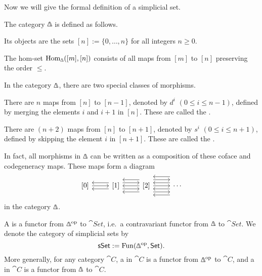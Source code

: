 Now we will give the formal definition of a simplicial set.

\begin{definition}
    The category $\bfDelta$ is defined as follows.
    \begin{itms}
        \item Its objects are the sets $[n]:=\{0,\dotsc,n\}$ for all integers $n\geq0$.
        \item The hom-set $\Hom_\bfDelta([m],[n])$ consists of all maps from $[m]$ to $[n]$
              preserving the order $\leq$.
    \end{itms}
\end{definition}

In the category $\bfDelta$, there are two special classes of morphisms.
\begin{itms}
    \item There are $n$ maps from $[n]$ to $[n-1]$,
    denoted by $d^i$ $(0\leq i\leq n-1)$,
    defined by merging the elements $i$ and $i+1$ in $[n]$.
    These are called the .
    \item There are $(n+2)$ maps from $[n]$ to $[n+1]$,
    denoted by $s^i$ $(0\leq i\leq n+1)$,
    defined by skipping the element $i$ in $[n+1]$.
    These are called the .
\end{itms}
In fact, all morphisms in $\bfDelta$
can be written as a composition of these coface and codegeneracy maps.
These maps form a diagram
\[\begin{tikzcd}
    \relax[0]\ar[r] &
    \relax[1]\ar[l,shift left=1ex]\ar[l,shift right=1ex]\ar[r,shift left=1ex]\ar[r,shift right=1ex] &
    \relax[2]\ar[l,shift left=2ex]\ar[l]\ar[l,shift right=2ex]\ar[r,shift left=2ex]\ar[r]\ar[r,shift right=2ex] &
    \cdots\ar[l,shift left=3ex]\ar[l,shift left=1ex]\ar[l,shift right=1ex]\ar[l,shift right=3ex]
\end{tikzcd}\]
in the category $\bfDelta$.

\begin{definition}
    A  is a functor from $\bfDelta\op$ to $\cat{Set}$,
    i.e.\ a contravariant functor from $\bfDelta$ to $\cat{Set}$.
    We denote the category of simplicial sets by
    \[\cat{sSet}:=\operatorname{Fun}(\bfDelta\op,\cat{Set}).\]
    More generally, for any category $\cat C$,
    a  in $\cat C$ is a functor from $\bfDelta\op$ to $\cat{C}$,
    and a  in $\cat C$ is a functor from $\bfDelta$ to $\cat{C}$.
\end{definition}

